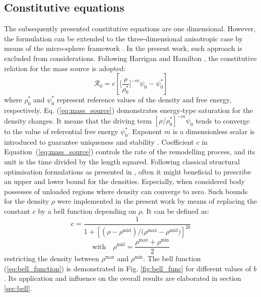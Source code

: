\documentclass[11pt]{acmeArticle}
\numberwithin{equation}{section}
\begin{document}
\subsection{Constitutive equations}
The subsequently presented constitutive equations are one dimensional. However, the formulation can be extended to the three-dimensional anisotropic case by means of the micro-sphere framework \citep{Waffenschmidt2012}. In the present work, such approach is excluded from considerations.
Following Harrigan and Hamilton \citep{Harrigan1993}, the constitutive relation for the mass source is adopted:
\begin{equation}
\mathcal{R}_{0}=c\left[\Biggl[\frac{\rho}{\rho_{0}^{\ast}}\Biggr]^{-m}\psi_{0}-\psi_{0}^{\ast}\right]
\label{eq:mass_source}
\end{equation}
where $\rho_0^\ast$ and $\psi_{0}^\ast$ represent reference values of the density and free energy, respectively.  Eq. (\ref{eq:mass_source}) demonstrates energy-type saturation for the density changes. It means that the driving term $\left[ \rho / \rho_0^\ast \right]^{-m}\psi_0$ tends to converge to the value of referential free energy $\psi_{0}^\ast$. 
Exponent $m$ is a dimensionless scalar is introduced to guarantee uniqueness and stability \citep{Harrigan1993} . 
Coefficient $c$ in Equation~(\ref{eq:mass_source}) controls the rate of the remodelling process, and its unit is the time divided by the length squared. Following classical structural optimisation formulations as presented in \citep{Waffenschmidt2012}, often it might beneficial to prescribe an upper and lower bound for the densities. Especially, when considered body possesses of unloaded regions where density can converge to zero. Such bounds for the density $\rho$ were implemented in the present work by means of replacing the constant $c$ by a bell function depending on $\rho$. It can be defined as:
\begin{equation*}
c=\frac{1}{1 + \left[  (\rho - \rho^{\mathrm{mid}}) / (\rho{^\mathrm{max}} - \rho{^\mathrm{mid})} \right]^{2 b}}
\end{equation*}
\begin{equation}
\mathrm{with} \quad \rho^{\mathrm{mid}} = \frac{\rho{^\mathrm{max}} + \rho{^\mathrm{min}}}{2}
\label{eq:bell_function}
\end{equation}
restricting the density between $ \rho{^\mathrm{max}}$ and $ \rho{^\mathrm{min}}$. The bell function (\ref{eq:bell_function}) is demonstrated in Fig. \ref{fig:bell_func} for different values of $b$. Its application and influence on the overall results are elaborated in section \ref{sec:bell}.
\end{document}
